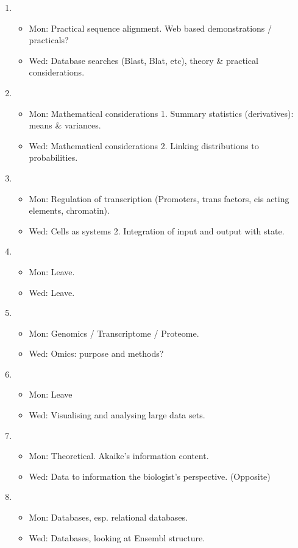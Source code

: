 \documentclass{article}
\begin{document}
\begin{enumerate}
\item 
\begin{itemize}
\item Mon: Practical sequence alignment. Web based demonstrations / practicals?
\item Wed: Database searches (Blast, Blat, etc), theory \& practical considerations.
\end{itemize}
\item 
\begin{itemize}
\item Mon: Mathematical considerations 1. Summary statistics (derivatives): means \& variances.
\item Wed: Mathematical considerations 2. Linking distributions to probabilities.
\end{itemize}
\item 
\begin{itemize}
\item Mon: Regulation of transcription (Promoters, trans factors, cis acting elements, chromatin).
\item Wed: Cells as systems 2. Integration of input and output with state.
\end{itemize}
\item 
\begin{itemize}
\item Mon: Leave.
\item Wed: Leave.
\end{itemize}
\item 
\begin{itemize}
\item Mon: Genomics / Transcriptome / Proteome.
\item Wed: Omics: purpose and methods?
\end{itemize}
\item 
\begin{itemize}
\item Mon: Leave
\item Wed: Visualising and analysing large data sets.
\end{itemize}
\item 
\begin{itemize}
\item Mon: Theoretical. Akaike's information content.
\item Wed: Data to information the biologist's perspective. (Opposite)
\end{itemize}
\item 
\begin{itemize}
\item Mon: Databases, esp. relational databases.
\item Wed: Databases, looking at Ensembl structure.
\end{itemize}
\end{enumerate}
\end{document}
